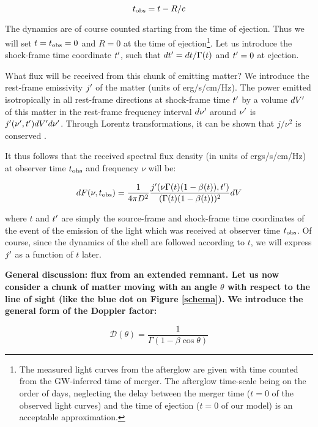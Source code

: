 \begin{equation}\label{tobs}
    t_{\mathrm{obs}} = t - R/c
\end{equation}

The dynamics are of course counted starting from the time of ejection. Thus we will set $t = t_{\mathrm{obs}} =0$ and $R = 0$ at the time of ejection\footnote{The measured light curves from the afterglow are given with time counted from the GW-inferred time of merger. The afterglow time-scale being on the order of days, neglecting the delay between the merger time ($t = 0$ of the observed light curves) and the time of ejection ($t = 0$ of our model) is an acceptable approximation.}. Let us introduce the shock-frame time coordinate $t^{\prime}$, such that $dt^{\prime} = dt/\Gamma(t)$ and $t^{\prime} = 0$ at ejection.

What flux will be received from this chunk of emitting matter? We introduce the rest-frame emissivity $j^{\prime}$ of the matter (units of erg/s/cm/Hz). The power emitted isotropically in all rest-frame directions at shock-frame time $t^{\prime}$ by a volume $dV^{\prime}$ of this matter in the rest-frame frequency interval $d\nu^{\prime}$ around $\nu^{\prime}$ is $j^{\prime}(\nu^{\prime}, t^{\prime})dV^{\prime} d\nu^{\prime}$. Through Lorentz transformations, it can be shown that $j/\nu^2$ is conserved \citep[see e.g][sec. 4]{55}.

It thus follows that the received spectral flux density (in units of ergs/s/cm/Hz) at observer time $t_{\mathrm{obs}}$ and frequency $\nu$ will be:

\begin{equation}dF(\nu, t_{\mathrm{obs}}) = \frac{1}{4\pi D^2} \frac{j^{\prime}(\nu \Gamma(t)(1 - \beta(t)), t^{\prime})}{(\Gamma(t)(1 - \beta(t)))^2}dV\end{equation}

where $t$ and $t^{\prime}$ are simply the source-frame and shock-frame time coordinates of the event of the emission of the light which was received at observer time $t_{\mathrm{obs}}$. Of course, since the dynamics of the shell are followed according to $t$, we will express $j^{\prime}$ as a function of $t$ later.

\bf{General discussion: flux from an extended remnant.} Let us now consider a chunk of matter moving with an angle $\theta$ with respect to the line of sight (like the blue dot on Figure \ref{schema}). We introduce the general form of the Doppler factor:

\begin{equation}\label{doppler}
\mathcal{D}(\theta) = \frac{1}{\Gamma(1 - \beta \cos \theta)}
\end{equation}

